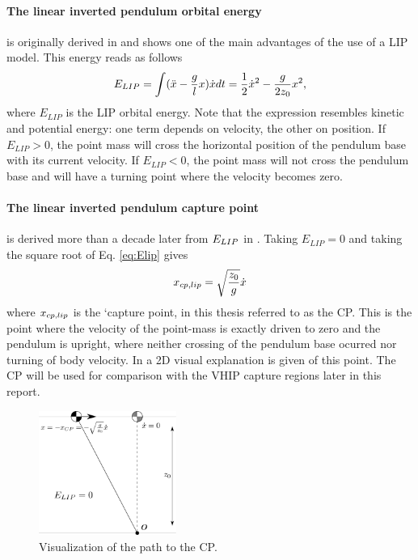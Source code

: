 \paragraph{The linear inverted pendulum orbital energy}\label{subsec:liporbit} is originally derived in \cite{kajita1992dynamic} and shows one of the main advantages of the use of a \ac{LIP} model.  This energy reads as follows
\begin{equation}
E_{LIP} = \int (\ddot{x}-\frac{g}{l}x)\dot{x} dt = \frac{1}{2}\dot{x}^2-\frac{g}{2z_0}x^2,
\label{eq:Elip}
\end{equation}
where $E_{LIP}$ is the \ac{LIP} orbital energy. Note that the expression resembles kinetic and potential energy: one term depends on velocity, the other on position. If $E_{LIP}>0$, the point mass will cross the horizontal position of the pendulum base with its current velocity. If $E_{LIP}<0$, the point mass will not cross the pendulum base and will have a turning point where the velocity becomes zero.

\paragraph{The linear inverted pendulum capture point} is derived more than a decade later from $E_{LIP}$ in \cite{pratt2006capture}. Taking $E_{LIP}=0$ and taking the square root of Eq.  \eqref{eq:Elip} gives
\begin{equation}
x_{cp,lip}=\sqrt{ \frac{z_0}{g}}\dot{x} 
\label{eq:cp}
\end{equation}
where $x_{cp,lip}$ is the `capture point, in this thesis referred to as the \ac{CP}. This is the point where the velocity of the point-mass is exactly driven to zero and the pendulum is upright, where neither crossing of the pendulum base ocurred nor turning of body velocity. In  a \ac{2D} visual explanation is given of this point. The \ac{CP} will be used for comparison with the \ac{VHIP} capture regions later in this report.
\begin{figure}
\centering
\includegraphics[width=0.4\textwidth]{STYLESTUFF/2DICP.png}
\caption{Visualization of the path to the \ac{CP}. }
\label{fig:2dicp}
\end{figure}

